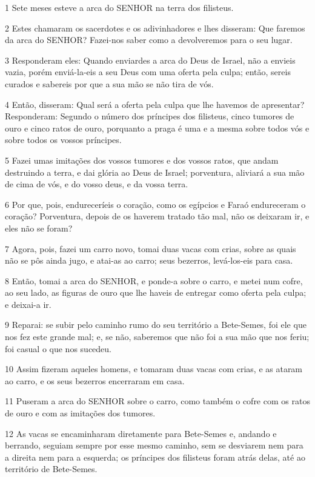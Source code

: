 \par 1 Sete meses esteve a arca do SENHOR na terra dos filisteus.
\par 2 Estes chamaram os sacerdotes e os adivinhadores e lhes disseram: Que faremos da arca do SENHOR? Fazei-nos saber como a devolveremos para o seu lugar.
\par 3 Responderam eles: Quando enviardes a arca do Deus de Israel, não a envieis vazia, porém enviá-la-eis a seu Deus com uma oferta pela culpa; então, sereis curados e sabereis por que a sua mão se não tira de vós.
\par 4 Então, disseram: Qual será a oferta pela culpa que lhe havemos de apresentar? Responderam: Segundo o número dos príncipes dos filisteus, cinco tumores de ouro e cinco ratos de ouro, porquanto a praga é uma e a mesma sobre todos vós e sobre todos os vossos príncipes.
\par 5 Fazei umas imitações dos vossos tumores e dos vossos ratos, que andam destruindo a terra, e dai glória ao Deus de Israel; porventura, aliviará a sua mão de cima de vós, e do vosso deus, e da vossa terra.
\par 6 Por que, pois, endureceríeis o coração, como os egípcios e Faraó endureceram o coração? Porventura, depois de os haverem tratado tão mal, não os deixaram ir, e eles não se foram?
\par 7 Agora, pois, fazei um carro novo, tomai duas vacas com crias, sobre as quais não se pôs ainda jugo, e atai-as ao carro; seus bezerros, levá-los-eis para casa.
\par 8 Então, tomai a arca do SENHOR, e ponde-a sobre o carro, e metei num cofre, ao seu lado, as figuras de ouro que lhe haveis de entregar como oferta pela culpa; e deixai-a ir.
\par 9 Reparai: se subir pelo caminho rumo do seu território a Bete-Semes, foi ele que nos fez este grande mal; e, se não, saberemos que não foi a sua mão que nos feriu; foi casual o que nos sucedeu.
\par 10 Assim fizeram aqueles homens, e tomaram duas vacas com crias, e as ataram ao carro, e os seus bezerros encerraram em casa.
\par 11 Puseram a arca do SENHOR sobre o carro, como também o cofre com os ratos de ouro e com as imitações dos tumores.
\par 12 As vacas se encaminharam diretamente para Bete-Semes e, andando e berrando, seguiam sempre por esse mesmo caminho, sem se desviarem nem para a direita nem para a esquerda; os príncipes dos filisteus foram atrás delas, até ao território de Bete-Semes.
